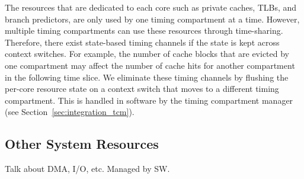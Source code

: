 The resources that are dedicated to each core such as private caches,
TLBs, and branch predictors, are only used by one timing compartment at a time.
However, multiple timing compartments can use these resources through 
time-sharing. Therefore, there exist state-based timing channels if the state is
kept across context switches. For example, the number of cache blocks that
are evicted by one compartment may affect the number of cache hits for
another compartment in the following time slice.
We eliminate these timing channels by flushing the per-core resource state 
on a context switch that moves to a different timing compartment.
This is handled in software by the timing compartment 
manager (see Section~\ref{sec:integration_tcm}).

\subsection{Other System Resources}

Talk about DMA, I/O, etc. Managed by SW.

